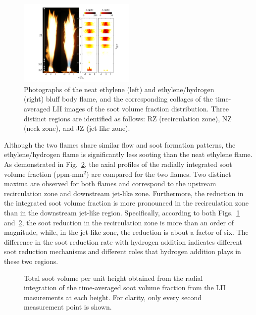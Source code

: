 \documentclass[review,3p,times]{elsarticle}
\begin{document}
\begin{figure}[t]
  \centering
  \scriptsize
  \vspace{-0.10in}
  \includegraphics[trim=16mm 5.0mm 8mm 5mm, clip=true, width=0.5\textwidth]{hy_overall.png}
  \normalsize
  \vspace{-0.2in}
  \caption{Photographs of the neat ethylene (left) and ethylene/hydrogen (right) bluff body flame, and the corresponding collages of the time-averaged LII images of the soot volume fraction distribution.  Three distinct regions are identified as follows: RZ (recirculation zone), NZ (neck zone), and JZ (jet-like zone).}
  \label{fig:H2_overall}
\end{figure}

Although the two flames share similar flow and soot formation patterns, the ethylene/hydrogen flame is significantly less sooting than the neat ethylene flame.  As demonstrated in Fig.~\ref{fig:ifv}, the axial profiles of the radially integrated soot volume fraction (ppm-mm$^2$) are compared for the two flames.  Two distinct maxima are observed for both flames and correspond to the upstream recirculation zone and downstream jet-like zone.  Furthermore, the reduction in the integrated soot volume fraction is more pronounced in the recirculation zone than in the downstream jet-like region.  Specifically, according to both Figs.~\ref{fig:H2_overall} and~\ref{fig:ifv}, the soot reduction in the recirculation zone is more than an order of magnitude, while, in the jet-like zone, the reduction is about a factor of six.  The difference in the soot reduction rate with hydrogen addition indicates different soot reduction mechanisms and different roles that hydrogen addition plays in these two regions.  

\begin{figure}[t]
  \centering
  \scriptsize
  \vspace{-0.10in}
  \resizebox{0.5\textwidth}{!}{}
  \normalsize
  \vspace{-0.2in}
  \caption{Total soot volume per unit height obtained from the radial integration of the time-averaged soot volume fraction from the LII masurements at each height.  For clarity, only every second measurement point is shown.}
  \label{fig:ifv}
\end{figure}
\end{document}

